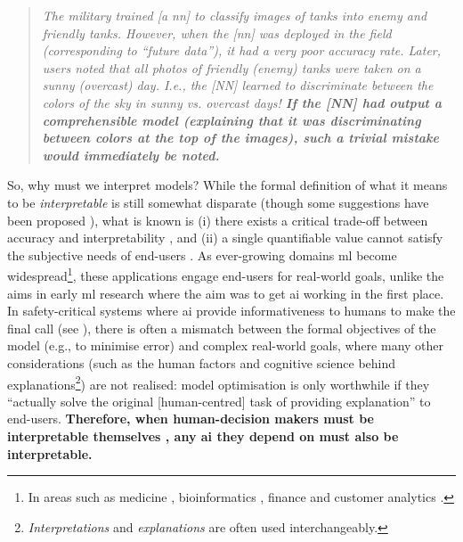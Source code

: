 \begin{quote}
\itshape
The military trained [a \gls{nn}] to classify images of tanks into enemy and friendly tanks. However, when the [\gls{nn}] was deployed in the field (corresponding to ``future data''), it had a very poor accuracy rate. Later, users noted that all photos of friendly (enemy) tanks were taken on a sunny (overcast) day. I.e., the [\gls{NN}] learned to discriminate between the colors of the sky in sunny vs. overcast days! \textbf{If the [\gls{NN}] had output a comprehensible model (explaining that it was discriminating between colors at the top of the images), such a trivial mistake would immediately be noted.} \citep{Freitas:2014ic}
\end{quote}

So, why must we interpret models? While the formal definition of what it means to be \textit{interpretable} is still somewhat disparate (though some suggestions have been proposed \citep{Lipton:2016if}), what is known is (i) there exists a critical trade-off between accuracy and interpretability \citep{Freitas:2004vv,Jin:2006uf,Kaufman:1999vg,Grunwald:2007vg,Domingos:1998ug,Zahalka:2011ux}, and (ii) a single quantifiable value cannot satisfy the subjective needs of end-users \citep{Freitas:2014ic}. As ever-growing domains \gls{ml} become widespread\footnote{In areas such as medicine \citep{Bellazzi:2008tv,Lavrac:1999tf,Pazzani:2001tw,Richards:2001vw,Zupan:2000tp,VanAssche:2007wc,Johansson:2009uo,Elazmeh:2007tp,Wong:2006ve,Jaspers:2011hy,Bussone:2015wm}, bioinformatics \citep{Freitas:2010vk,Szafron:2004uf,Karwath:2002tv,Doderer:2006vt,Jiang:2005ua}, finance \citep{Baehrens:2010tj,Huysmans:2011gq,Dhar:2000vo} and customer analytics \citep{Verbeke:2011vo,Lima:2009tm}.}, these applications engage end-users for real-world goals, unlike the aims in early \gls{ml} research where the aim was to get \gls{ai} working in the first place. In safety-critical systems where \gls{ai} provide informativeness to humans to make the final call (see \citep{Caruana:2015jk,Kim:2015vo,Huysmans:2011gq}), there is often a mismatch between the formal objectives of the model (e.g., to minimise error) and complex real-world goals, where many other considerations (such as the human factors and cognitive science behind explanations\footnote{\textit{Interpretations} and \textit{explanations} are often used interchangeably.}) are not realised: model optimisation is only worthwhile if they ``actually solve the original [human-centred] task of providing explanation'' \citep{Narayanan:2018ud} to end-users. \textbf{Therefore, when human-decision makers must be interpretable themselves \citep{Ridgeway:1998ud}, any \gls{ai} they depend on must also be interpretable.} 

